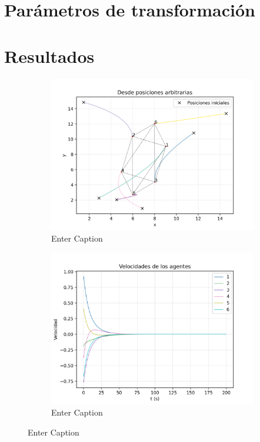 \documentclass[11pt, a4paper]{article} %
\begin{document}
\section{Parámetros de transformación} \label{transform}


\section{Resultados}

\begin{figure}
	\begin{subfigure}[t]{0.46\textwidth}
    	\centering
    	\includegraphics[width=\linewidth]{posiciones.arb2d.png}
    	\caption{Enter Caption}
    	\label{fig:2dcombi}
	\end{subfigure}
	\hspace{0.1cm}
	\begin{subfigure}[t]{0.46\textwidth}
    	\centering
    	\includegraphics[width=\linewidth]{vels.2d.png}
    	\caption{Enter Caption}
    	\label{fig:3dcombi}
	\end{subfigure}
\end{figure}


\pagebreak


\end{document}
